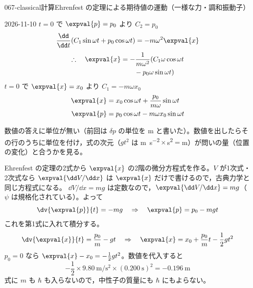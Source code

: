 \documentclass[uplatex,dvipdfmx,a4paper,11pt]{jsarticle}
\begin{document}
\begin{mondai}{067-classical}{計算}{Ehrenfest の定理による期待値の運動（一様な力・調和振動子）}
\begin{kotaeutsushi}{2026-11-10}
$t=0$ で $\expval{p}=p_{0}$ より $C_{2}=p_{0}$
\[ \frac{\dd}{\dd t}(C_{1}\sin\omega t+p_{0}\cos\omega t)=-m\omega^{2}\expval{x} \]
\begin{align*}
\therefore\quad\expval{x}&=-\frac{1}{m\omega^{2}}(C_{1}\omega\cos\omega t\\
&\qquad-p_{0}\omega\sin\omega t)
\end{align*}
$t=0$ で $\expval{x}=x_{0}$ より $C_{1}=-m\omega x_{0}$
\begin{align*}
\expval{x}&=x_{0}\cos\omega t+\frac{p_{0}}{m\omega}\sin\omega t\\
\expval{p}&=p_{0}\cos\omega t-m\omega x_{0}\sin\omega t
\end{align*}
\end{kotaeutsushi}
\begin{kizuki}
\item {} 数値の答えに単位が無い（前回は $\delta p$ の単位を \unit{\metre} と書いた）。数値を出したらその行のうちに単位を付け，式の次元（$gt^{2}$ は \unit{\metre\per\second\squared}${}\times{}$\unit{\second\squared}${}={}$\unit{\metre}）が問いの量（位置の変化）と合うかを見る。
\end{kizuki}
\begin{tadashii}
\houshin Ehrenfest の定理の2式から $\expval{x}$ の2階の微分方程式を作る。$V$ が1次式・2次式なら $\expval{\dd V/\dd x}$ は $\expval{x}$ だけで書けるので，古典力学と同じ方程式になる。
\keisan {} $\dd V/\dd x=mg$ は定数なので，$\expval{\dd V/\dd x}=mg$（$\psi$ は規格化されている）。よって
\[ \dv{\expval{p}}{t}=-mg\quad\Rightarrow\quad \expval{p}=p_{0}-mgt \]
これを第1式に入れて積分する。
\[ \dv{\expval{x}}{t}=\frac{p_{0}}{m}-gt\quad\Rightarrow\quad \expval{x}=x_{0}+\frac{p_{0}}{m}t-\frac{1}{2}gt^{2} \]
 $p_{0}=0$ なら $\expval{x}-x_{0}=-\frac{1}{2}gt^{2}$。数値を代入すると
\[ -\frac{1}{2}\times\qty{9.80}{\metre\per\second\squared}\times(\qty{0.200}{\second})^{2}=-\qty{0.196}{\metre} \]
式に $m$ も $\hbar$ も入らないので，中性子の質量にも $\hbar$ にもよらない。


\end{tadashii}
\end{mondai}
\end{document}
